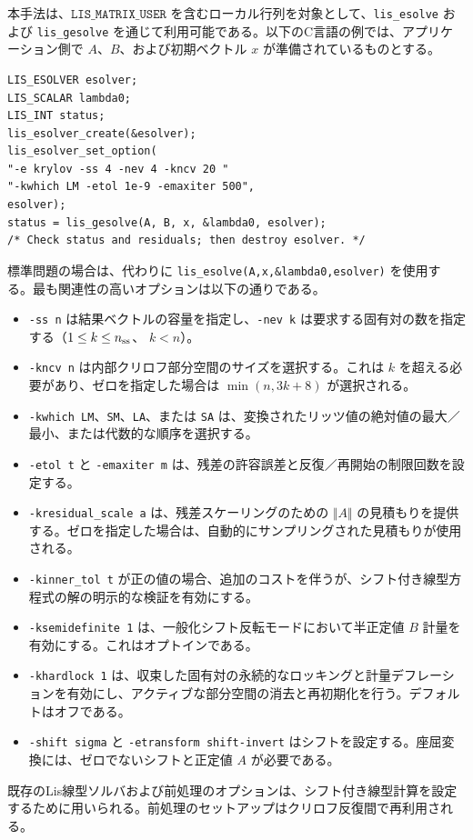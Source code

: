 \documentclass[a4paper]{jarticle}
\begin{document}
{{本手法は、\(\texttt{LIS\_MATRIX\_USER}\) を含むローカル行列を対象として、\verb|lis_esolve| および \verb|lis_gesolve| を通じて利用可能である。以下のC言語の例では、アプリケーション側で $A$、$B$、および初期ベクトル $x$ が準備されているものとする。
\begin{verbatim}
LIS_ESOLVER esolver;
LIS_SCALAR lambda0;
LIS_INT status;
lis_esolver_create(&esolver);
lis_esolver_set_option(
"-e krylov -ss 4 -nev 4 -kncv 20 "
"-kwhich LM -etol 1e-9 -emaxiter 500",
esolver);
status = lis_gesolve(A, B, x, &lambda0, esolver);
/* Check status and residuals; then destroy esolver. */ \end{verbatim}
標準問題の場合は、代わりに \verb|lis_esolve(A,x,&lambda0,esolver)| を使用する。最も関連性の高いオプションは以下の通りである。
\begin{itemize}
\item \verb|-ss n| は結果ベクトルの容量を指定し、\verb|-nev k| は要求する固有対の数を指定する（\(1\leq k\leq n_{\rm ss}\)、 $k<n$）。
\item \verb|-kncv n| は内部クリロフ部分空間のサイズを選択する。これは $k$ を超える必要があり、ゼロを指定した場合は \(\min(n,3k+8)\) が選択される。
\item \verb|-kwhich LM|、\verb|SM|、\verb|LA|、または \verb|SA| は、変換されたリッツ値の絶対値の最大／最小、または代数的な順序を選択する。
\item \verb|-etol t| と \verb|-emaxiter m| は、残差の許容誤差と反復／再開始の制限回数を設定する。
\item \verb|-kresidual_scale a| は、残差スケーリングのための \(\Vert{} A\Vert{}\) の見積もりを提供する。ゼロを指定した場合は、自動的にサンプリングされた見積もりが使用される。
\item \verb|-kinner_tol t| が正の値の場合、追加のコストを伴うが、シフト付き線型方程式の解の明示的な検証を有効にする。
\item \verb|-ksemidefinite 1| は、一般化シフト反転モードにおいて半正定値 $B$ 計量を有効にする。これはオプトインである。
\item \verb|-khardlock 1| は、収束した固有対の永続的なロッキングと計量デフレーションを有効にし、アクティブな部分空間の消去と再初期化を行う。デフォルトはオフである。
\item \verb|-shift sigma| と \verb|-etransform shift-invert| はシフトを設定する。座屈変換には、ゼロでないシフトと正定値 $A$ が必要である。
\end{itemize}
既存のLis線型ソルバおよび前処理のオプションは、シフト付き線型計算を設定するために用いられる。前処理のセットアップはクリロフ反復間で再利用される。

}}
\end{document}
